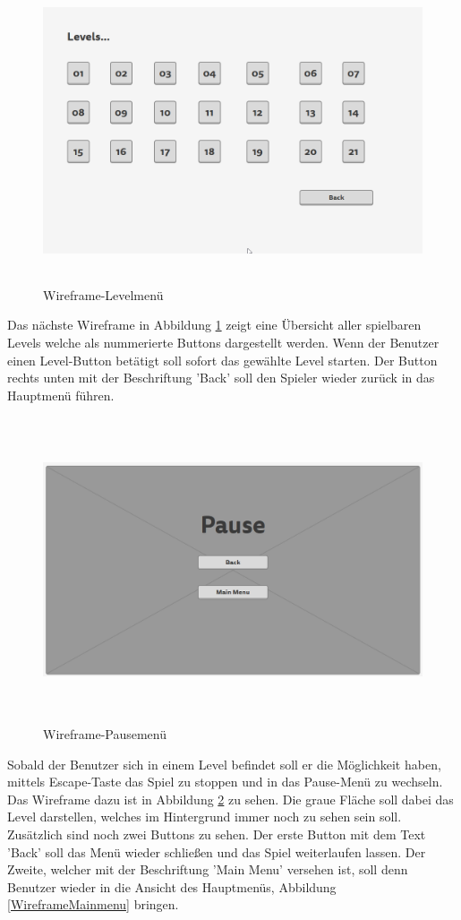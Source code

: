 \begin{figure}[H]
	\centering
	\includegraphics[width=16cm, height=9cm]{images/WireframeLevelsmenu.png}
	\caption{Wireframe-Levelmenü}
	\label{WireframeLevelsmenu}
\end{figure}
Das nächste Wireframe in Abbildung \ref{WireframeLevelsmenu} zeigt eine Übersicht aller spielbaren Levels welche als nummerierte Buttons dargestellt werden. Wenn der Benutzer einen Level-Button betätigt soll sofort das gewählte Level starten. Der Button rechts unten mit der Beschriftung ’Back’ soll den Spieler wieder zurück in das Hauptmenü führen.

\begin{figure}[H]
	\centering
	\includegraphics[width=16cm, height=9cm]{images/WireframePausemenu.png}
	\caption{Wireframe-Pausemenü}
	\label{WireframePausemenu}
\end{figure}
Sobald der Benutzer sich in einem Level befindet soll er die Möglichkeit haben, mittels Escape-Taste das Spiel zu stoppen und in das Pause-Menü zu wechseln. Das Wireframe dazu ist in Abbildung \ref{WireframePausemenu} zu sehen. Die graue Fläche soll dabei das Level darstellen, welches im Hintergrund immer noch zu sehen sein soll. Zusätzlich sind noch zwei Buttons zu sehen. Der erste Button mit dem Text ’Back’ soll das Menü wieder schließen und das Spiel weiterlaufen lassen. Der Zweite, welcher mit der Beschriftung ’Main Menu’ versehen ist, soll denn Benutzer wieder in die Ansicht des Hauptmenüs, Abbildung \ref{WireframeMainmenu} bringen.

